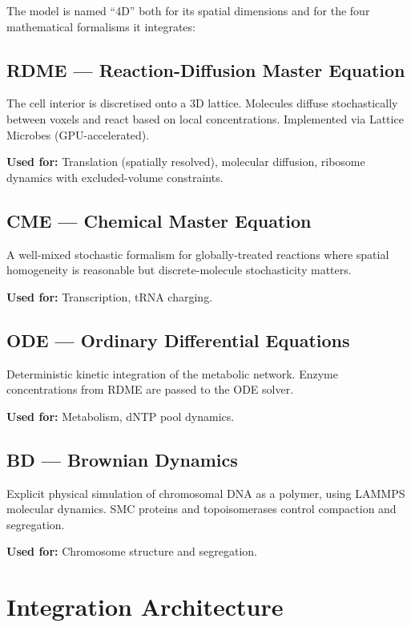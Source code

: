\documentclass[11pt,a4paper]{report}
\begin{document}
The model is named ``4D'' both for its spatial dimensions and for the four mathematical formalisms it integrates:

\subsection{RDME --- Reaction-Diffusion Master Equation}

The cell interior is discretised onto a 3D lattice. Molecules diffuse stochastically between voxels and react based on local concentrations. Implemented via Lattice Microbes (GPU-accelerated).

\textbf{Used for:} Translation (spatially resolved), molecular diffusion, ribosome dynamics with excluded-volume constraints.

\subsection{CME --- Chemical Master Equation}

A well-mixed stochastic formalism for globally-treated reactions where spatial homogeneity is reasonable but discrete-molecule stochasticity matters.

\textbf{Used for:} Transcription, tRNA charging.

\subsection{ODE --- Ordinary Differential Equations}

Deterministic kinetic integration of the metabolic network. Enzyme concentrations from RDME are passed to the ODE solver.

\textbf{Used for:} Metabolism, dNTP pool dynamics.

\subsection{BD --- Brownian Dynamics}

Explicit physical simulation of chromosomal DNA as a polymer, using LAMMPS molecular dynamics. SMC proteins and topoisomerases control compaction and segregation.

\textbf{Used for:} Chromosome structure and segregation.

\section{Integration Architecture}
\end{document}
